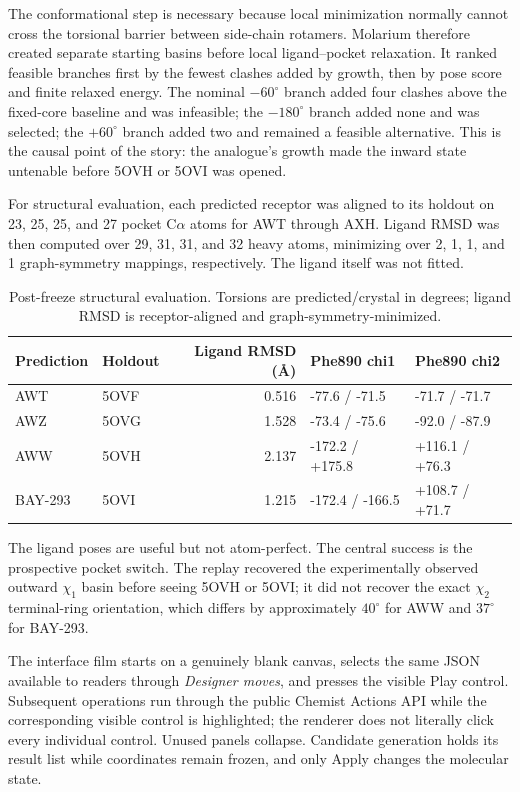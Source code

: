 The conformational step is necessary because local minimization normally cannot
cross the torsional barrier between side-chain rotamers. Molarium therefore
created separate starting basins before local ligand--pocket relaxation. It
ranked feasible branches first by the fewest clashes added by growth, then by
pose score and finite relaxed energy. The nominal $-60^\circ$ branch added four
clashes above the fixed-core baseline and was infeasible; the
$-180^\circ$ branch added none and was selected; the $+60^\circ$ branch added
two and remained a feasible alternative. This is the causal point of the story:
the analogue's growth made the inward state untenable before 5OVH or 5OVI was
opened.

For structural evaluation, each predicted receptor was aligned to its holdout
on 23, 25, 25, and 27 pocket C$\alpha$ atoms for AWT through AXH. Ligand RMSD was
then computed over 29, 31, 31, and 32 heavy atoms, minimizing over 2, 1, 1, and
1 graph-symmetry mappings, respectively. The ligand itself was not fitted.

\begin{table}[htbp]
  \centering
  \caption{Post-freeze structural evaluation. Torsions are predicted/crystal in
  degrees; ligand RMSD is receptor-aligned and graph-symmetry-minimized.}
  \label{tab:sos1-evaluation}
  \footnotesize
  \begin{tabular}{@{}llrll@{}}
    \toprule
    Prediction & Holdout & Ligand RMSD (\AA) & Phe890 chi1 & Phe890 chi2 \\
    \midrule
    AWT & 5OVF & 0.516 & -77.6 / -71.5 & -71.7 / -71.7 \\
    AWZ & 5OVG & 1.528 & -73.4 / -75.6 & -92.0 / -87.9 \\
    AWW & 5OVH & 2.137 & -172.2 / +175.8 & +116.1 / +76.3 \\
    BAY-293 & 5OVI & 1.215 & -172.4 / -166.5 & +108.7 / +71.7 \\
    \bottomrule
  \end{tabular}
\end{table}
\FloatBarrier

The ligand poses are useful but not atom-perfect. The central success is the
prospective pocket switch. The replay recovered the experimentally observed
outward $\chi_1$ basin before seeing 5OVH or 5OVI; it did not recover the exact
$\chi_2$ terminal-ring orientation, which differs by approximately $40^\circ$
for AWW and $37^\circ$ for BAY-293.

The interface film starts on a genuinely blank canvas, selects the same JSON
available to readers through \emph{Designer moves}, and presses the visible Play
control. Subsequent operations run through the public Chemist Actions API while
the corresponding visible control is highlighted; the renderer does not
literally click every individual control. Unused panels collapse. Candidate
generation holds its result list while coordinates remain frozen, and only
Apply changes the molecular state.

